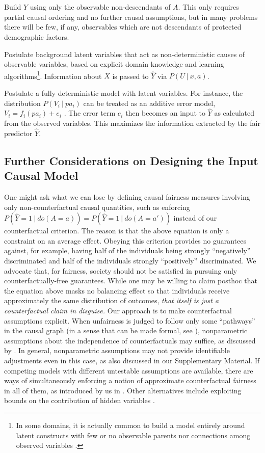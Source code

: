   Build $\hat Y$ using only the observable
non-descendants of $A$.  This only requires partial causal ordering
and no further causal assumptions, but in many problems there will be
few, if any, observables which are not descendants of protected
demographic factors.
  
 Postulate background latent variables that
act as non-deterministic causes of observable variables, based on
explicit domain knowledge and learning algorithms\footnote{In some
  domains, it is actually common to build a model entirely around
  latent constructs with few or no observable parents nor connections
  among observed variables \citep{bol:89}.}. Information about $X$ is
passed to $\hat Y$ via $P(U\ |\ x, a)$.

 Postulate a fully deterministic model with
latent variables. For instance, the distribution $P(V_i\ |\ pa_i)$
can be treated as an additive error model, $V_i
\!=\! f_i(pa_i) \!+\! e_i$ \citep{peters:14}. The
error term $e_i$ then becomes an input to $\hat Y$ as calculated from
the observed variables. This maximizes the information extracted by
the fair predictor $\hat Y$.

\subsection{Further Considerations on Designing the Input Causal Model}
\label{sec:pragmatic}

One might ask what we can lose by defining causal fairness measures involving
only non-counterfactual causal quantities, such as enforcing $P(\hat Y =
1\ |\ do(A = a)) = P(\hat Y = 1\ |\ do(A = a'))$ instead of our
counterfactual criterion. The reason is that the above equation is
only a constraint on an average effect. Obeying this criterion
provides no guarantees against, for example, having half of the
individuals being strongly ``negatively'' discriminated and half of
the individuals strongly ``positively'' discriminated.  We advocate
that, for fairness, society should not be satisfied in pursuing only
counterfactually-free guarantees. While one may be willing to claim
posthoc that the equation above masks no balancing effect so that
individuals receive approximately the same distribution of outcomes,
{\it that itself is just a counterfactual claim in disguise.} Our
approach is to make counterfactual assumptions explicit. When
unfairness is judged to follow only some ``pathways'' in the causal
graph (in a sense that can be made formal, see
\cite{kilbertus:17,nabi:17}), nonparametric assumptions about the
independence of counterfactuals may suffice, as discussed by
\cite{nabi:17}. In general, nonparametric assumptions may not provide
identifiable adjustments even in this case, as also discussed in our
Supplementary Material.  If competing models with different untestable
assumptions are available, there are ways of simultaneously enforcing a notion of
approximate counterfactual fairness in all of them, as introduced by
us in \cite{russell:17}. Other alternatives include exploiting
bounds on the contribution of hidden variables \cite{pearl:16,silva:16}.

